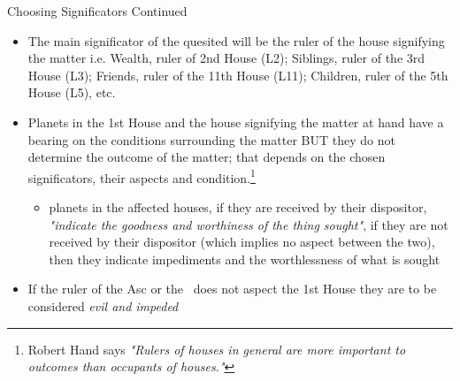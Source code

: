\begin{frame}[t]{Choosing Significators Continued}
\begin{itemize}
\item The main significator of the quesited will be the ruler of the house signifying the matter i.e.  Wealth, ruler of 2nd House (L2); Siblings, ruler of the 3rd House (L3); Friends, ruler of the 11th House (L11); Children, ruler of the 5th House (L5), etc.
\item Planets in the 1st House and the house signifying the matter at hand have a bearing on the conditions surrounding the matter BUT they do not determine the outcome of the matter; that depends on the chosen significators, their aspects and condition.\footnote{Robert Hand says \textsl{"Rulers of houses in general are more important to outcomes than occupants of houses."}}
	\begin{itemize}
		\item planets in the affected houses, if they are received by their dispositor, \textsl{"indicate the goodness and worthiness of the thing sought"}, if they are not received by their dispositor (which implies no aspect between the two), then they indicate impediments and the worthlessness of what is sought
	\end{itemize}
\item If the ruler of the Asc or the \Moon\ does not aspect the 1st House they are to be considered \textsl{evil and impeded}
\end{itemize}

\end{frame}
